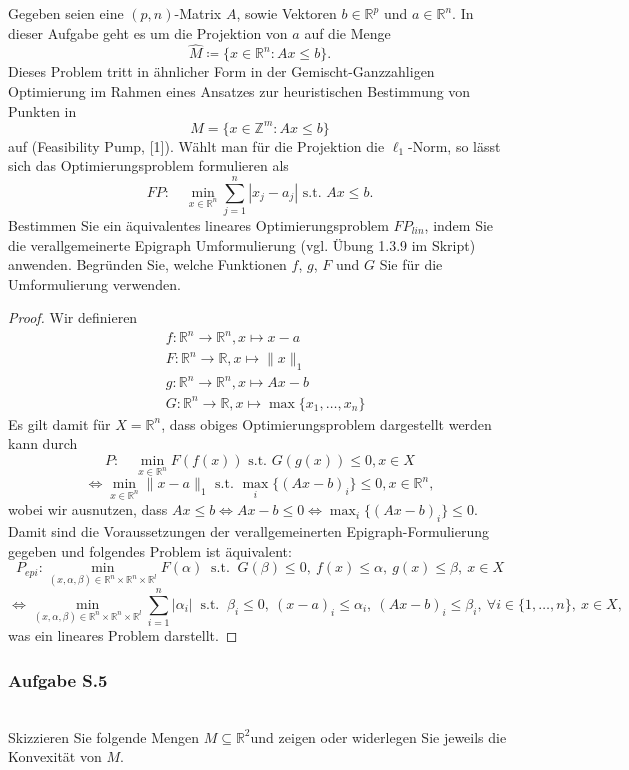 \documentclass[12pt]{extreport} %
\newcommand{\R}{\mathbb{R}}
\newcommand{\Z}{\mathbb{Z}}
\theoremstyle{named}
\theoremstyle{nnamed}
\theoremstyle{itshape}
\theoremstyle{normal}
\begin{document}
Gegeben seien eine $(p, n)$-Matrix $A$, sowie Vektoren $b \in \R^p$ und $a \in \R^n$. In dieser Aufgabe geht es um die Projektion von $a$ auf die Menge
$$ \hat{M} \coloneqq \big\{ x \in \R^n \colon A x \leq b \big\}. $$
Dieses Problem tritt in ähnlicher Form in der Gemischt-Ganzzahligen Optimierung im Rahmen
eines Ansatzes zur heuristischen Bestimmung von Punkten in
$$ M = \big\{ x \in \Z^m \colon Ax \leq b \big\} $$
auf (Feasibility Pump, [1]). Wählt man für die Projektion die $\ell_1$-Norm, so lässt sich das
Optimierungsproblem formulieren als
$$ FP \colon \quad \min_{x \in \R^n} \sum_{j=1}^{n} \left| x_j - a_j \right| \text{ s.t. } Ax \leq b. $$
Bestimmen Sie ein äquivalentes lineares Optimierungsproblem $FP_{lin}$, indem Sie die verallgemeinerte Epigraph Umformulierung (vgl. Übung 1.3.9 im Skript) anwenden. Begründen Sie, welche Funktionen $f$, $g$, $F$ und $G$ Sie für die Umformulierung verwenden.
\begin{proof}
	Wir definieren
	\begin{align*}
		& f \colon \R^n \rightarrow \R^n, x \mapsto x - a \\
		& F \colon \R^n \rightarrow \R, x \mapsto \| x \|_1 \\
		& g \colon \R^n \rightarrow \R^n, x \mapsto Ax - b \\
		& G \colon \R^n \rightarrow \R, x \mapsto \max \{ x_1, \dotsc, x_n \}	
	\end{align*}
	Es gilt damit für $X = \R^n$, dass obiges Optimierungsproblem dargestellt werden kann durch
	$$ P: \quad \min_{x \in \R^n} F(f(x)) \text{ s.t. } G(g(x)) \leq 0, x \in X $$
	$$ \iff \min_{x \in \R^n} \| x - a \|_1 \text{ s.t. } \max_i \{ (Ax - b)_i \} \leq 0, x \in \R^n, $$
	wobei wir ausnutzen, dass $Ax \leq b \iff Ax -b \leq 0 \iff  \max_i \{ (Ax - b)_i \} \leq 0$. Damit sind die Voraussetzungen der verallgemeinerten Epigraph-Formulierung gegeben und folgendes Problem ist äquivalent:
	$$ P_{epi}: \min_{(x, \alpha, \beta) \in \R^n \times \R^n \times \R^l} F(\alpha) ~ \text{ s.t. } ~ G(\beta) \leq 0, ~ f(x) \leq \alpha, ~ g(x) \leq \beta, ~ x \in X $$ 
	$$ \iff \min_{(x, \alpha, \beta) \in \R^n \times \R^n \times \R^l} \sum_{i=1}^n |\alpha_i| ~ \text{ s.t. } ~ \beta_i \leq 0, ~ (x - a)_i \leq \alpha_i, ~ (Ax - b)_i \leq \beta_i, ~\forall i \in \{1, \dotsc, n \}, ~ x \in X, $$
	was ein lineares Problem darstellt.
\end{proof}

\newpage

\subsubsection{Aufgabe S.5} ~\\
Skizzieren Sie folgende Mengen $M \subseteq \R^2$und zeigen oder widerlegen Sie jeweils die Konvexität von $M$. ~\\ ~\\
\end{document}

